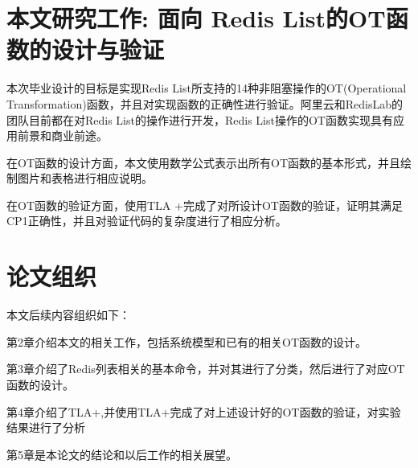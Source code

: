 \section{本文研究工作: 面向 Redis List的OT函数的设计与验证}
	\par 本次毕业设计的目标是实现Redis List所支持的14种非阻塞操作的OT(Operational Transformation)函数，并且对实现函数的正确性进行验证。阿里云和RedisLab的团队目前都在对Redis List的操作进行开发，Redis List操作的OT函数实现具有应用前景和商业前途。

	\par 在OT函数的设计方面，本文使用数学公式表示出所有OT函数的基本形式，并且绘制图片和表格进行相应说明。

	\par 在OT函数的验证方面，使用TLA +完成了对所设计OT函数的验证，证明其满足CP1正确性，并且对验证代码的复杂度进行了相应分析。
\section{论文组织}
	\par 本文后续内容组织如下：
	\par 第2章介绍本文的相关工作，包括系统模型和已有的相关OT函数的设计。
	\par 第3章介绍了Redis列表相关的基本命令，并对其进行了分类，然后进行了对应OT函数的设计。
	\par 第4章介绍了TLA+,并使用TLA+完成了对上述设计好的OT函数的验证，对实验结果进行了分析
	\par 第5章是本论文的结论和以后工作的相关展望。